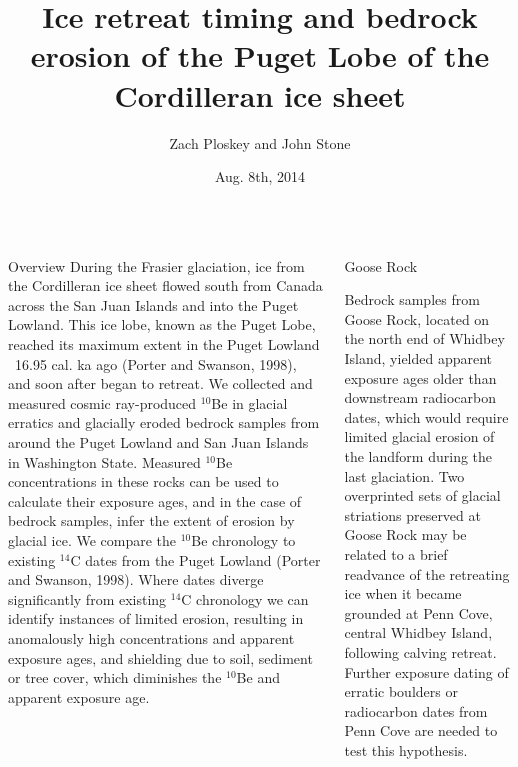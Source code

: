 \documentclass{beamer}
\title{Ice retreat timing and bedrock erosion of the Puget Lobe of the Cordilleran ice sheet}
\author{Zach Ploskey and John Stone}
\institute{Cosmogenic Nuclide Lab, Dept. of Earth and Space Sciences, University of Washington, Seattle}
\date{Aug. 8th, 2014}
\begin{document}
\begin{frame}{}\centering

\begin{columns}[T]

\begin{column}{0.32\columnwidth}

\begin{block}{Overview}	
During the Frasier glaciation, ice from the Cordilleran ice sheet flowed south from Canada across the San Juan Islands and into the Puget Lowland.
This ice lobe, known as the Puget Lobe, reached its maximum extent in the Puget Lowland ~16.95 cal. ka ago  (Porter and Swanson, 1998), and soon after began to retreat.
We collected and measured cosmic ray-produced $^{10}$Be in glacial erratics and glacially eroded bedrock samples from around the Puget Lowland and San Juan Islands in Washington State.
Measured $^{10}$Be concentrations in these rocks can be used to calculate their exposure ages, and in the case of bedrock samples, infer the extent of erosion by glacial ice.
We compare the $^{10}$Be chronology to existing $^{14}$C dates from the Puget Lowland (Porter and Swanson, 1998).
Where dates diverge significantly from existing $^{14}$C chronology we can identify instances of limited erosion, resulting in anomalously high concentrations and apparent exposure ages, and shielding due to soil, sediment or tree cover, which diminishes the $^{10}$Be and apparent exposure age.

\end{block}


\end{column}
	
\begin{column}{.32\columnwidth}
	
\begin{block}{Goose Rock}

Bedrock samples from Goose  Rock, located on the north end of Whidbey Island, yielded apparent exposure ages older than downstream radiocarbon dates, which would require limited glacial erosion of the landform during the last glaciation.
Two overprinted sets of glacial striations preserved at Goose Rock may be related to a brief readvance of the retreating ice when it became grounded at Penn Cove, central Whidbey Island, following calving retreat.
Further exposure dating of erratic boulders or radiocarbon dates from Penn Cove are needed to test this hypothesis. 
	
\end{block}
	

\end{column}
\end{columns}
\end{frame}
\end{document}
